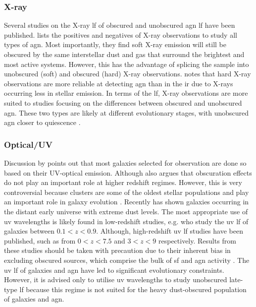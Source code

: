 \subsubsection{X-ray}
Several studies on the X-ray \gls{lf} of obscured and unobscured \gls{agn} \gls{lf} have been published. \cite{aird_evolution_2015} lists the positives and negatives of X-ray observations to study all types of \gls{agn}. Most importantly, they find soft X-ray emission will still be obscured by the same interstellar dust and gas that surround the brightest and most active systems. However, this has the advantage of splicing the sample into unobscured (soft) and obscured (hard) X-ray observations. \cite{ananna_bass_2022} notes that hard X-ray observations are more reliable at detecting \gls{agn} than in the \gls{ir} due to X-rays occurring less in stellar emission. In terms of the \gls{lf}, X-ray observations are more suited to studies focusing on the differences between obscured and unobscured \gls{agn}. These two types are likely at different evolutionary stages, with unobscured \gls{agn} closer to quiescence \citep{frias_castillo_at_2024}. 

\subsubsection{Optical/UV}
Discussion by \cite{finkelstein_coevolution_2022} points out that most galaxies selected for observation are done so based on their UV-optical emission. Although \cite{finkelstein_coevolution_2022} also argues that obscuration effects do not play an important role at higher redshift regimes. However, this is very controversial because clusters are some of the oldest stellar populations \citep{wylezalek_galaxy_2014} and play an important role in galaxy evolution \citep{croton_many_2006, wang_bright_2021}. Recently \cite{labbe_population_2023} has shown galaxies occurring in the distant early universe with extreme dust levels. The most appropriate use of \gls{uv} wavelengths is likely found in low-redshift studies, e.g. \cite{jurek_wigglez_2013} who study the \gls{uv} \gls{lf} of galaxies between $0.1<z<0.9$. Although, high-redshift \gls{uv} \gls{lf} studies have been published, such as \cite{kulkarni_evolution_2019, finkelstein_coevolution_2022} from $0<z<7.5$ and $3<z<9$ respectively. Results from these studies should be taken with precaution due to their inherent bias in excluding obscured sources, which comprise the bulk of \gls{sf} and \gls{agn} activity \citep{gruppioni_modelling_2011, toba_9_2013}. The \gls{uv} \gls{lf} of galaxies and \gls{agn} have led to significant evolutionary constraints. However, it is advised only to utilise \gls{uv} wavelengths to study unobscured late-type \gls{lf} because this regime is not suited for the heavy dust-obscured population of galaxies and \gls{agn}.  

